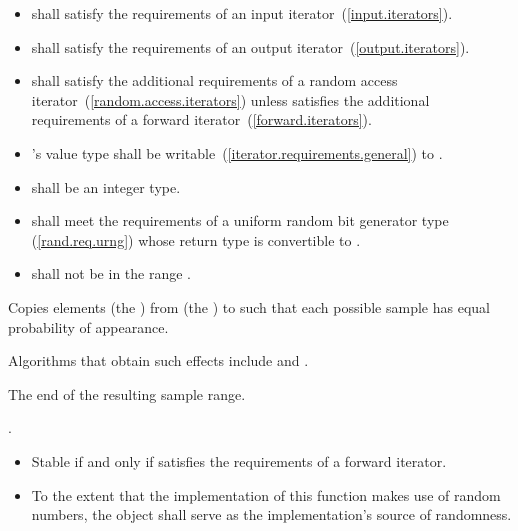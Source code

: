 \begin{itemdescr}
\pnum
\requires
\begin{itemize}
\item
{} shall satisfy the requirements of an input iterator~(\ref{input.iterators}).
\item
{} shall satisfy the requirements of an output iterator~(\ref{output.iterators}).
\item
{} shall satisfy the additional requirements of a random access iterator~(\ref{random.access.iterators})
unless  satisfies the additional requirements of a forward iterator~(\ref{forward.iterators}).
\item
{}'s value type shall be writable~(\ref{iterator.requirements.general}) to .
\item
{} shall be an integer type.
\item
{}
shall meet the requirements of a uniform random bit generator type (\ref{rand.req.urng})
whose return type is convertible to .
\item
{} shall not be in the range .
\end{itemize}

\pnum
\effects
Copies  elements (the )
from  (the ) to 
such that each possible sample has equal probability of appearance.
\begin{note}
Algorithms that obtain such effects include 
and .
\end{note}

\pnum
\returns
The end of the resulting sample range.

\pnum
\complexity
{}.

\pnum
\remarks
\begin{itemize}
\item
Stable if and only if  satisfies the
requirements of a forward iterator.
\item
To the extent that the implementation of this function makes use of
random numbers, the object  shall serve as the
implementation's source of randomness.
\end{itemize}
\end{itemdescr}

